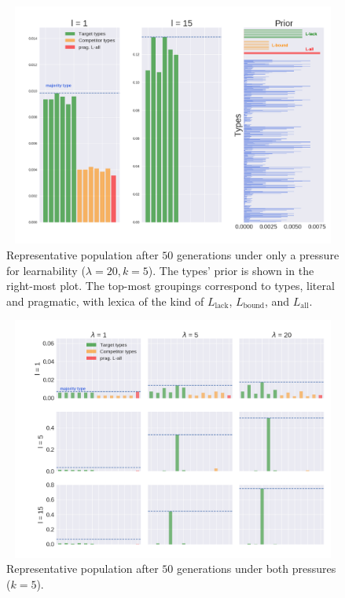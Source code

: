 \documentclass[a4paper, 11pt]{article}
\theoremstyle{Satz}
\newcommand{\mylang}[1]{\ensuremath{L_{\text{#1}}}\xspace} %
\newcommand{\Lall}{\mylang{all}}
\newcommand{\Lbound}{\mylang{bound}}
\newcommand{\Llack}{\mylang{lack}}
\begin{document}
\begin{figure}[h!]
\centering
\includegraphics[width=1\textwidth,height=8cm,keepaspectratio]{./plots/alt-fig2-onlym-pr}
\caption{Representative population after $50$ generations under only a
  pressure for learnability ($\lambda = 20, k = 5$). The types' prior is shown in the
  right-most plot. The top-most groupings correspond to types, literal and pragmatic, with
  lexica of the kind of $\Llack$, $\Lbound$, and $\Lall$.}
\label{fig:only-M}
\end{figure}

\begin{figure}[h!]
\centering
\includegraphics[width=1\textwidth,height=8cm,keepaspectratio]{./plots/alt-fig3-r+m}
\caption{Representative population after $50$ generations under both pressures ($k = 5$).}
\label{fig:rmd}
\end{figure}



\end{document}
